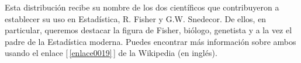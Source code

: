     \begin{center}
    \end{center}
Esta distribución recibe su nombre de los dos científicos que contribuyeron a establecer su uso en
Estadística, R. Fisher y G.W. Snedecor. De ellos, en particular, queremos destacar la figura de
Fisher, biólogo, genetista y a la vez el padre de la Estadística moderna. Puedes encontrar más
información sobre ambos usando el enlace [\,\ref{enlace0019}\,]\label{enlace0019a} de la Wikipedia (en inglés).

